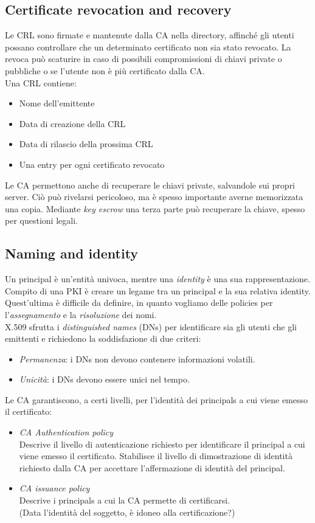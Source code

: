 \documentclass[a4paper, 11pt, twoside, openright, fleqn]{report}
\begin{document}
\subsection{Certificate revocation and recovery}
Le CRL sono firmate e mantenute dalla CA nella directory, affinché gli utenti possano controllare che un determinato certificato non sia stato revocato. La revoca può scaturire in caso di possibili compromissioni di chiavi private o pubbliche o se l'utente non è più certificato dalla CA.\\
Una CRL contiene:
\begin{itemize}
	\item Nome dell'emittente
	\item Data di creazione della CRL
	\item Data di rilascio della prossima CRL
	\item Una entry per ogni certificato revocato
\end{itemize}
Le CA permettono anche di recuperare le chiavi private, salvandole sui propri server. Ciò può rivelarsi pericoloso, ma è spesso importante averne memorizzata una copia. Mediante \emph{key escrow} una terza parte può recuperare la chiave, spesso per questioni legali.

\subsection{Naming and identity}
Un principal è un'entità univoca, mentre una \emph{identity} è una sua rappresentazione. Compito di una PKI è creare un legame tra un principal e la sua relativa identity. Quest'ultima è difficile da definire, in quanto vogliamo delle policies per l'\emph{assegnamento} e la \emph{risoluzione} dei nomi.\\
X.509 sfrutta i \emph{distinguished names} (DNs) per identificare sia gli utenti che gli emittenti e richiedono la soddisfazione di due criteri:
\begin{itemize}
	\item \emph{Permanenza}: i DNs non devono contenere informazioni volatili.
	\item \emph{Unicità}: i DNs devono essere unici nel tempo.
\end{itemize}
Le CA garantiscono, a certi livelli, per l'identità dei principals a cui viene emesso il certificato:
\begin{itemize}
	\item \emph{CA Authentication policy}\\
	Descrive il livello di autenticazione richiesto per identificare il principal a cui viene emesso il certificato. Stabilisce il livello di dimostrazione di identità richiesto dalla CA per accettare l'affermazione di identità del principal.
	\item \emph{CA issuance policy}\\
	Descrive i principals a cui la CA permette di certificarsi.\\
	(Data l'identità del soggetto, è idoneo alla certificazione?)
\end{itemize}
\end{document}
